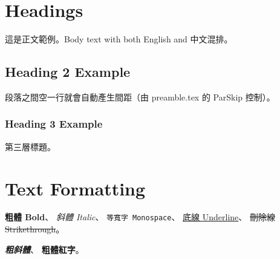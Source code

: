 \documentclass[a4paper,12pt]{article}
\begin{document}
\maketitle

\section{Headings}


這是正文範例。Body text with both English and 中文混排。

\subsection{Heading 2 Example}

段落之間空一行就會自動產生間距（由 preamble.tex 的 ParSkip 控制）。

\subsubsection{Heading 3 Example}

第三層標題。

\section{Text Formatting}

\textbf{粗體 Bold}、
\textit{斜體 Italic}、
\texttt{等寬字 Monospace}、
\underline{底線 Underline}、
\sout{刪除線 Strikethrough}。

\textbf{\textit{粗斜體}}、
{\bfseries\color{red}粗體紅字}。
\end{document}
